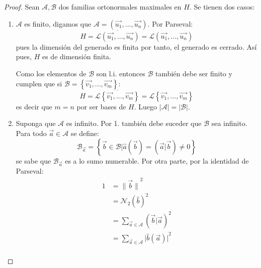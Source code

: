 \documentclass[12pt]{report}
\newcounter{it}
\theoremstyle{largebreak}
\newcommand\abs[1]{\ensuremath{\big|#1\big|}}
\newcommand\norm[1]{\ensuremath{\|#1\|}}
\newcommand\pint[2]{\ensuremath{\left(#1\big| #2\right)}}
\newcommand{\N}[2]{\ensuremath{\mathcal{N}_{#1}\left(#2\right)}}
\begin{document}
    \begin{proof}
        Sean $\mathcal{A},\mathcal{B}$ dos familias ortonormales maximales en $H$. Se tienen dos casos:
        \begin{enumerate}
            \item $\mathcal{A}$ es finito, digamos que $\mathcal{A}=\left(\vec{u_1},...,\vec{u_n} \right)$. Por Parseval:
            \begin{equation*}
                H=\overline{\mathcal{L}(\vec{u_1},...,\vec{u_n})}=\mathcal{L}(\vec{u_1},...,\vec{u_n})
            \end{equation*}
            pues la dimensión del generado es finita por tanto, el generado es cerrado. Así pues, $H$ es de dimensión finita.
            
            Como los elementos de $\mathcal{B}$ son l.i. entonces $\mathcal{B}$ también debe ser finito y cumplen que si $\mathcal{B}=\left\{\vec{v_1},...,\vec{v_m} \right\}$:
            \begin{equation*}
                H=\overline{\mathcal{L}\left\{\vec{v_1},...,\vec{v_m} \right\}}=\mathcal{L}\left\{\vec{v_1},...,\vec{v_m} \right\}
            \end{equation*}
            es decir que $m=n$ por ser bases de $H$. Luego $\abs{\mathcal{A}}=\abs{\mathcal{B}}$.
            \item Suponga que $\mathcal{A}$ es infinito. Por 1. también debe suceder que $\mathcal{B}$ sea infinito. Para todo $\vec{a}\in\mathcal{A}$ se define:
            \begin{equation*}
                \mathcal{B}_{\vec{a}}=\left\{\vec{b}\in\mathcal{B}\Big|\hat{a}\left(\vec{b}\right) =\pint{\vec{a}}{\vec{b}}\neq0 \right\}
            \end{equation*}
            se sabe que $\mathcal{B}_{\vec{a}}$ es a lo sumo numerable. Por otra parte, por la identidad de Parseval:
            \begin{equation*}
                \begin{split}
                    1&=\norm{\vec{b}}^2\\
                    &=\N{2}{\hat{b}}^2\\
                    &=\sum_{\vec{a}\in\mathcal{A}}\pint{\vec{b}}{\vec{a}}^2\\
                    &=\sum_{\vec{a}\in\mathcal{A}}\abs{\hat{b}(\vec{a})}^2\\
                \end{split}
            \end{equation*}

\end{enumerate}
\end{proof}
\end{document}
